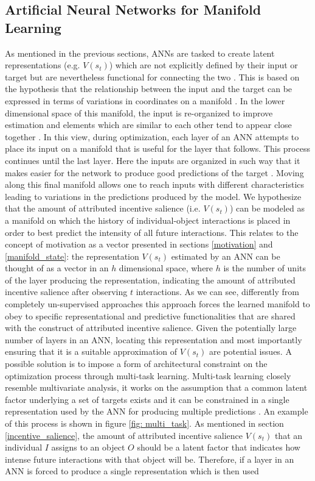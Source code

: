 \subsection{Artificial Neural Networks for Manifold Learning}
\label{manifold_learning}
As mentioned in the previous sections, ANNs are tasked to create latent representations (e.g. $V(s_{t})$) which are not explicitly defined by their input or target but are nevertheless functional for connecting the two \cite{rumelhart1986learning,bengio2017deep,lillicrap2020backpropagation}. This is based on the hypothesis that the relationship between the input and the target can be expressed in terms of variations in coordinates on a manifold \cite{bengio2017deep}. In the lower dimensional space of this manifold, the input is re-organized to improve estimation and elements which are similar to each other tend to appear close together \cite{bengio2017deep}. In this view, during optimization, each layer of an ANN attempts to place its input on a manifold that is useful for the layer that follows. This process continues until the last layer. Here the inputs are organized in such way that it makes easier for the network to produce good predictions of the target \cite{bengio2017deep}. Moving along this final manifold allows one to reach inputs with different characteristics leading to variations in the predictions produced by the model. We hypothesize that the amount of attributed incentive salience (i.e. $V(s_{t})$) can be modeled as a manifold on which the history of individual-object interactions is placed in order to best predict the intensity of all future interactions. This relates to the concept of motivation as a vector presented in sections \ref{motivation} and \ref{manifold_state}: the representation $V(s_{t})$ estimated by an ANN can be thought of as a vector in an $h$ dimensional space, where $h$ is the number of units of the layer producing the representation, indicating the amount of attributed incentive salience after observing $t$ interactions. As we can see, differently from completely un-supervised approaches this approach forces the learned manifold to obey to specific representational and predictive functionalities that are shared with the construct of attributed incentive salience. Given the potentially large number of layers in an ANN, locating this representation and most importantly ensuring that it is a suitable approximation of $V(s_{t})$ are potential issues. A possible solution is to impose a form of architectural constraint on the optimization process through multi-task learning. Multi-task learning closely resemble multivariate analysis, it  works on the assumption that a common latent factor underlying a set of targets exists and it can be constrained in a single representation used by the ANN for producing multiple predictions \cite{bengio2017deep}. An example of this process is shown in figure \ref{fig: multi_task}. As mentioned in section \ref{incentive_salience}, the amount of attributed incentive salience $V(s_t)$ that an individual $I$ assigns to an object $O$ should be a latent factor that indicates how intense future interactions with that object will be. Therefore, if a layer in an ANN is forced to produce a single representation which is then used 